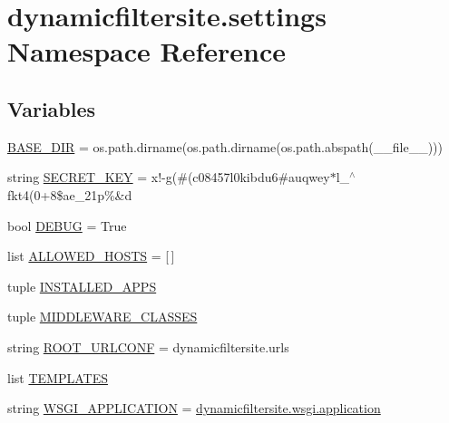 \hypertarget{namespacedynamicfiltersite_1_1settings}{}\section{dynamicfiltersite.\+settings Namespace Reference}
\label{namespacedynamicfiltersite_1_1settings}
\subsection*{Variables}
\begin{DoxyCompactItemize}
\item 
\hyperlink{namespacedynamicfiltersite_1_1settings_a6c7db55cb69a3846d254023debc5b6b6}{B\+A\+S\+E\+\_\+\+D\+IR} = os.\+path.\+dirname(os.\+path.\+dirname(os.\+path.\+abspath(\+\_\+\+\_\+file\+\_\+\+\_\+)))
\item 
string \hyperlink{namespacedynamicfiltersite_1_1settings_a4979e7faaf927fd6eff9849411f9e3c6}{S\+E\+C\+R\+E\+T\+\_\+\+K\+EY} = \textquotesingle{}x!-\/g(\#(c08457l0kibdu6\#auqwey$\ast$l\+\_\+$^\wedge$fkt4(0+8\$ae\+\_\+21p\%\&d\textquotesingle{}
\item 
bool \hyperlink{namespacedynamicfiltersite_1_1settings_a117352cc494cc62c6b2f1882786a332c}{D\+E\+B\+UG} = True
\item 
list \hyperlink{namespacedynamicfiltersite_1_1settings_a1c65930ce3d00aea720781bc9c17b0b8}{A\+L\+L\+O\+W\+E\+D\+\_\+\+H\+O\+S\+TS} = \mbox{[}$\,$\mbox{]}
\item 
tuple \hyperlink{namespacedynamicfiltersite_1_1settings_a26c8442859071cd278fe3fe6485ea4f3}{I\+N\+S\+T\+A\+L\+L\+E\+D\+\_\+\+A\+P\+PS}
\item 
tuple \hyperlink{namespacedynamicfiltersite_1_1settings_a625748b6f9b2b18184a1f5447b74d728}{M\+I\+D\+D\+L\+E\+W\+A\+R\+E\+\_\+\+C\+L\+A\+S\+S\+ES}
\item 
string \hyperlink{namespacedynamicfiltersite_1_1settings_aeea25bc27cd24a96741399e2068f3531}{R\+O\+O\+T\+\_\+\+U\+R\+L\+C\+O\+NF} = \textquotesingle{}dynamicfiltersite.\+urls\textquotesingle{}
\item 
list \hyperlink{namespacedynamicfiltersite_1_1settings_a24cf38fb957c013ca45af12cb44f1337}{T\+E\+M\+P\+L\+A\+T\+ES}
\item 
string \hyperlink{namespacedynamicfiltersite_1_1settings_a9c343ae6b8eb80ef2de562528f3f00b9}{W\+S\+G\+I\+\_\+\+A\+P\+P\+L\+I\+C\+A\+T\+I\+ON} = \textquotesingle{}\hyperlink{namespacedynamicfiltersite_1_1wsgi_a9556574144704032c9e6bafa10276622}{dynamicfiltersite.\+wsgi.\+application}\textquotesingle{}

\end{DoxyCompactItemize}
